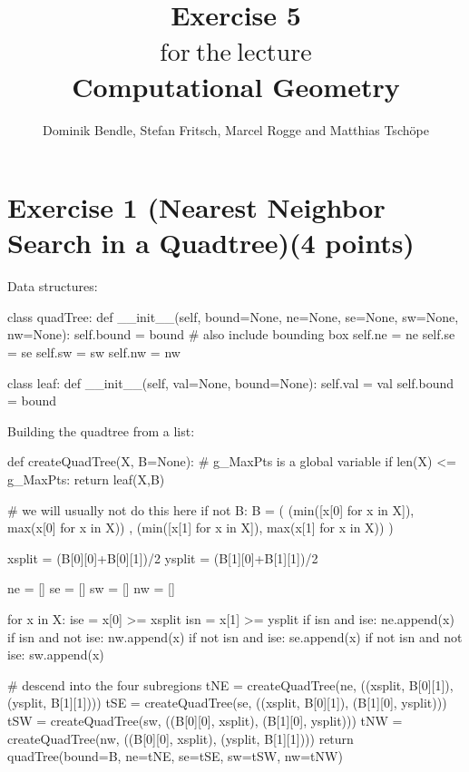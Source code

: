 \documentclass[english, fontsize=12pt, paper=a4, twoside=false, draft=true, pagesize=auto, version=last, DIV=16]{scrartcl}
\theoremstyle{break}
\begin{document}
\title{
\vspace*{-10mm}
Exercise 5 \\[-3pt]
{\Large $\mathrm{for \ the \ lecture}$} \\[-3pt]
{\LARGE \textbf{Computational Geometry}}
}
\author{Dominik Bendle, Stefan Fritsch, Marcel Rogge and Matthias Tschöpe}
\maketitle
\vspace*{-10mm}

\section*{\large Exercise 1 (Nearest Neighbor Search in a Quadtree){\normalsize \hfill (4 points)}}

Data structures:

\begin{python}
class quadTree:
    def __init__(self, bound=None, ne=None, se=None, sw=None, nw=None):
        self.bound = bound # also include bounding box
        self.ne = ne
        self.se = se
        self.sw = sw
        self.nw = nw

class leaf:
    def __init__(self, val=None, bound=None):
        self.val = val
        self.bound = bound
\end{python}

Building the quadtree from a list:

\begin{python}
def createQuadTree(X, B=None):
    # g_MaxPts is a global variable
    if len(X) <= g_MaxPts:
        return leaf(X,B)

    # we will usually not do this here
    if not B:
        B = ( (min([x[0] for x in X]), max(x[0] for x in X))
            , (min([x[1] for x in X]), max(x[1] for x in X))
            )

    xsplit = (B[0][0]+B[0][1])/2
    ysplit = (B[1][0]+B[1][1])/2

    ne = []
    se = []
    sw = []
    nw = []

    for x in X:
        ise = x[0] >= xsplit
        isn = x[1] >= ysplit
        if isn and ise:
            ne.append(x)
        if isn and not ise:
            nw.append(x)
        if not isn and ise:
            se.append(x)
        if not isn and not ise:
            sw.append(x)

    # descend into the four subregions
    tNE = createQuadTree(ne, ((xsplit, B[0][1]), (ysplit, B[1][1])))
    tSE = createQuadTree(se, ((xsplit, B[0][1]), (B[1][0], ysplit)))
    tSW = createQuadTree(sw, ((B[0][0], xsplit), (B[1][0], ysplit)))
    tNW = createQuadTree(nw, ((B[0][0], xsplit), (ysplit, B[1][1])))
    return quadTree(bound=B, ne=tNE, se=tSE, sw=tSW, nw=tNW)
\end{python}
\end{document}

